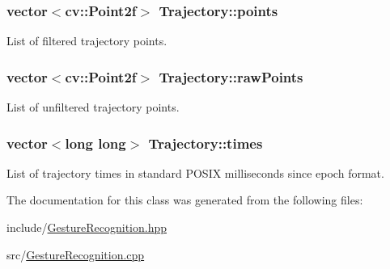 \hypertarget{classTrajectory_a6c7123595ac7699ca6c03b558ac7486d}{
\subsubsection[{points}]{\setlength{\rightskip}{0pt plus 5cm}vector$<$cv\-::\-Point2f$>$ {\bf \-Trajectory\-::points}}}\label{classTrajectory_a6c7123595ac7699ca6c03b558ac7486d}


\-List of filtered trajectory points. 

\hypertarget{classTrajectory_a3540dcfb0974fa9314fecf94aed0b82b}{
\subsubsection[{raw\-Points}]{\setlength{\rightskip}{0pt plus 5cm}vector$<$cv\-::\-Point2f$>$ {\bf \-Trajectory\-::raw\-Points}}}\label{classTrajectory_a3540dcfb0974fa9314fecf94aed0b82b}


\-List of unfiltered trajectory points. 

\hypertarget{classTrajectory_af4e494d9d3be73b8ba6fd476249d7ec1}{
\subsubsection[{times}]{\setlength{\rightskip}{0pt plus 5cm}vector$<$long long$>$ {\bf \-Trajectory\-::times}}}\label{classTrajectory_af4e494d9d3be73b8ba6fd476249d7ec1}


\-List of trajectory times in standard \-P\-O\-S\-I\-X milliseconds since epoch format. 



\-The documentation for this class was generated from the following files\-:\begin{DoxyCompactItemize}
\item 
include/\hyperlink{GestureRecognition_8hpp}{\-Gesture\-Recognition.\-hpp}\item 
src/\hyperlink{GestureRecognition_8cpp}{\-Gesture\-Recognition.\-cpp}\end{DoxyCompactItemize}
